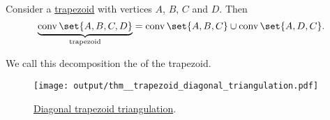\begin{proposition}\label{thm:diagonal_trapezoid_triangulation}
  Consider a \hyperref[def:trapezoid]{trapezoid} with vertices \( A \), \( B \), \( C \) and \( D \). Then
  \begin{equation*}
    \underbrace{\conv\set{ A, B, C, D }}_{\T{trapezoid}} = \conv\set{ A, B, C } \cup \conv\set{ A, D, C }.
  \end{equation*}

  We call this decomposition the  of the trapezoid.

  \begin{figure}[!ht]
    \centering
    \texttt{[image: output/thm\_\_trapezoid\_diagonal\_triangulation.pdf]}
    \caption{\hyperref[thm:diagonal_trapezoid_triangulation]{Diagonal trapezoid triangulation}.}\label{fig:thm:diagonal_trapezoid_triangulation}
  \end{figure}
\end{proposition}
